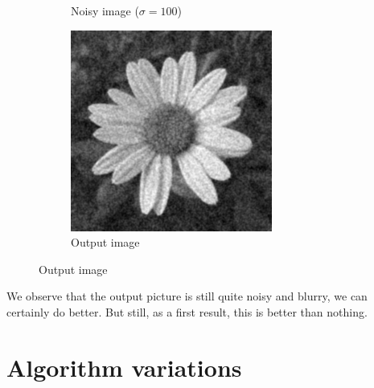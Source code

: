 \begin{figure}[H]
\begin{subfigure}[b]{0.32\textwidth}
        \caption{Noisy image (\(\sigma=100\))}
    \end{subfigure}
    \begin{subfigure}[b]{0.32\textwidth}
        \includegraphics[width=\textwidth]{img/flowerOutput.png}
        \caption{Output image}
    \end{subfigure}
\end{figure}

We observe that the output picture is still quite noisy and blurry, we can certainly do better. But still, as a first result, this is better than nothing.

\section{Algorithm variations}

